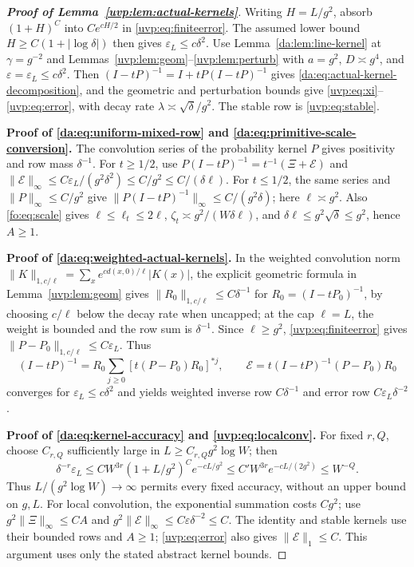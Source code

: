 \documentclass[11pt]{article}
\numberwithin{equation}{section}
\theoremstyle{remark}
\begin{document}
\begin{proof}[\textbf{Proof of Lemma~\ref{uvp:lem:actual-kernels}}]
Writing $H=L/g^2$, absorb $(1+H)^C$ into $Ce^{cH/2}$ in
\eqref{uvp:eq:finiteerror}. The assumed lower bound
$H\ge C(1+|\log\delta|)$ then gives $\varepsilon_L\le c\delta^2$.
Use Lemma~\ref{da:lem:line-kernel} at $\gamma=g^{-2}$ and
Lemmas~\ref{uvp:lem:geom}--\ref{uvp:lem:perturb} with $a=g^2$,
$D\asymp g^4$, and $\varepsilon=\varepsilon_L\le c\delta^2$.
Then $(I-tP)^{-1}=I+tP(I-tP)^{-1}$ gives
\eqref{da:eq:actual-kernel-decomposition}, and the geometric and
perturbation bounds give \eqref{uvp:eq:xi}--\eqref{uvp:eq:error},
with decay rate $\lambda\asymp\sqrt\delta/g^2$.
The stable row is \eqref{uvp:eq:stable}.

\noindent\textbf{Proof of \eqref{da:eq:uniform-mixed-row} and
\eqref{da:eq:primitive-scale-conversion}.}
The convolution series of the probability kernel $P$ gives positivity
and row mass $\delta^{-1}$. For $t\ge1/2$, use
$P(I-tP)^{-1}=t^{-1}(\Xi+\mathcal E)$ and
$\|\mathcal E\|_\infty\le C\varepsilon_L/(g^2\delta^2)
\le C/g^2\le C/(\delta\ell)$.
For $t\le1/2$, the same series and $\|P\|_\infty\le C/g^2$ give
$\|P(I-tP)^{-1}\|_\infty\le C/(g^2\delta)$; here $\ell\asymp g^2$.
Also \eqref{fo:eq:scale} gives
$\ell\le\ell_t\le2\ell$, $\zeta_t\asymp g^2/(W\delta\ell)$,
and $\delta\ell\le g^2\sqrt\delta\le g^2$, hence $A\ge1$.

\noindent\textbf{Proof of \eqref{da:eq:weighted-actual-kernels}.}
In the weighted convolution norm
$\|K\|_{1,c/\ell}=\sum_xe^{cd(x,0)/\ell}|K(x)|$,
the explicit geometric formula in Lemma~\ref{uvp:lem:geom} gives
$\|R_0\|_{1,c/\ell}\le C\delta^{-1}$ for $R_0=(I-tP_0)^{-1}$,
by choosing $c/\ell$ below the decay rate when uncapped; at the cap
$\ell=L$, the weight is bounded and the row sum is $\delta^{-1}$.
Since $\ell\ge g^2$, \eqref{uvp:eq:finiteerror} gives
$\|P-P_0\|_{1,c/\ell}\le C\varepsilon_L$. Thus
\[
 (I-tP)^{-1}=R_0\sum_{j\ge0}[t(P-P_0)R_0]^{*j},\qquad
 \mathcal E=t(I-tP)^{-1}(P-P_0)R_0
\]
converges for $\varepsilon_L\le c\delta^2$ and yields weighted
inverse row $C\delta^{-1}$ and error row $C\varepsilon_L\delta^{-2}$.

\noindent\textbf{Proof of \eqref{da:eq:kernel-accuracy} and \eqref{uvp:eq:localconv}.}
For fixed $r,Q$, choose $C_{r,Q}$ sufficiently large in
$L\ge C_{r,Q}g^2\log W$; then
\[
 \delta^{-r}\varepsilon_L
 \le CW^{3r}(1+L/g^2)^Ce^{-cL/g^2}
 \le C'W^{3r}e^{-cL/(2g^2)}\le W^{-Q}.
\]
Thus $L/(g^2\log W)\to\infty$ permits every fixed accuracy,
without an upper bound on $g,L$.
For local convolution, the exponential summation costs $Cg^2$;
use $g^2\|\Xi\|_\infty\le CA$ and
$g^2\|\mathcal E\|_\infty\le C\varepsilon\delta^{-2}\le C$.
The identity and stable kernels use their bounded rows and $A\ge1$;
\eqref{uvp:eq:error} also gives $\|\mathcal E\|_1\le C$.
This argument uses only the stated abstract kernel bounds.
\end{proof}
\end{document}
